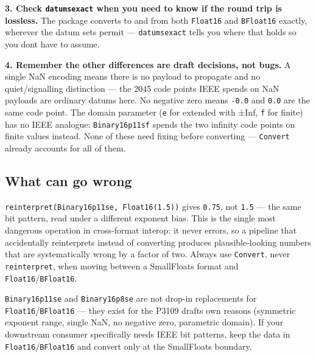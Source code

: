 \textbf{3. Check \texttt{datumsexact} when you need to know if the round trip is lossless.} The package converts to and from both \texttt{Float16} and \texttt{BFloat16} exactly, wherever the datum sets permit — \texttt{datumsexact} tells you where that holds so you don{\textquotesingle}t have to assume.



\textbf{4. Remember the other differences are draft decisions, not bugs.} A single NaN encoding means there is no payload to propagate and no quiet/signalling distinction — the 2045 code points IEEE spends on NaN payloads are ordinary datums here. No negative zero means \texttt{-0.0} and \texttt{0.0} are the same code point. The domain parameter (\texttt{e} for extended with ±Inf, \texttt{f} for finite) has no IEEE analogue: \texttt{Binary16p11sf} spends the two infinity code points on finite values instead. None of these need {\textquotedbl}fixing{\textquotedbl} before converting — \texttt{Convert} already accounts for all of them.



\subsection{What can go wrong}



\label{7385351218440078181-dup5}{}


\begin{tcolorbox}[toptitle=-1mm,bottomtitle=1mm,colback=admonition-warning!50!white,colframe=admonition-warning,title=\textbf{`reinterpret` silently returns the wrong value, off by 2×}]
\texttt{reinterpret(\allowbreak{}Binary16p11se, Float16(\allowbreak{}1.5))} gives \texttt{0.75}, not \texttt{1.5} — the same bit pattern, read under a different exponent bias. This is the single most dangerous operation in cross-format interop: it never errors, so a pipeline that accidentally reinterprets instead of converting produces plausible-looking numbers that are systematically wrong by a factor of two. Always use \texttt{Convert}, never \texttt{reinterpret}, when moving between a SmallFloats format and \texttt{Float16}/\allowbreak\texttt{BFloat16}.

\end{tcolorbox}


\begin{tcolorbox}[toptitle=-1mm,bottomtitle=1mm,colback=admonition-note!50!white,colframe=admonition-note,title=\textbf{If you want IEEE semantics, use Float16/BFloat16 directly}]
\texttt{Binary16p11se} and \texttt{Binary16p8se} are not drop-in replacements for \texttt{Float16}/\allowbreak\texttt{BFloat16} — they exist for the P3109 draft{\textquotesingle}s own reasons (symmetric exponent range, single NaN, no negative zero, parametric domain). If your downstream consumer specifically needs IEEE bit patterns, keep the data in \texttt{Float16}/\allowbreak\texttt{BFloat16} and convert only at the SmallFloats boundary.

\end{tcolorbox}


